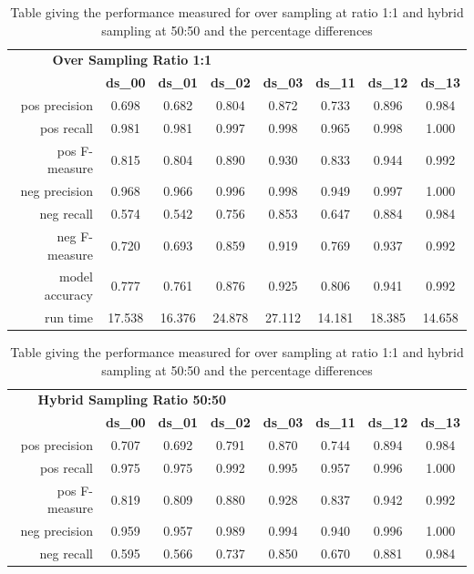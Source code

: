 \begin{table}[h]
\centering
\caption[Performance comparison of over sampling and hybrid sampling]{Table giving the performance measured for over sampling at ratio 1:1 and hybrid sampling at 50:50 and the percentage differences}
\label{tab:chapter5:performance_comparison}
\begin{tabular}{rccccccc}
	\toprule
	\multicolumn{4}{c}{\textbf{Over Sampling Ratio 1:1}} \\
	\cmidrule(r){1-4}
     & \textbf{ds\_00}  & \textbf{ds\_01} & \textbf{ds\_02} & \textbf{ds\_03} & \textbf{ds\_11} & \textbf{ds\_12} & \textbf{ds\_13}   \\
    \midrule
	pos precision & 0.698 & 0.682 & 0.804 & 0.872 & 0.733 & 0.896 & 0.984\\
	pos recall & 0.981 & 0.981 & 0.997 & 0.998 & 0.965 & 0.998 & 1.000\\
	pos F-measure & 0.815 & 0.804 & 0.890 & 0.930 & 0.833 & 0.944 & 0.992\\
	neg precision & 0.968 & 0.966 & 0.996 & 0.998 & 0.949 & 0.997 & 1.000\\
	neg recall & 0.574 & 0.542 & 0.756 & 0.853 & 0.647 & 0.884 & 0.984\\
	neg F-measure & 0.720 & 0.693 & 0.859 & 0.919 & 0.769 & 0.937 & 0.992\\
	model accuracy & 0.777 & 0.761 & 0.876 & 0.925 & 0.806 & 0.941 & 0.992\\
	run time & 17.538 & 16.376 & 24.878 & 27.112 & 14.181 & 18.385 & 14.658\\
    \bottomrule
\end{tabular}
\begin{tabular}{rccccccc}
	\multicolumn{4}{c}{\textbf{Hybrid Sampling Ratio 50:50}} \\
	\cmidrule(r){1-4}
     & \textbf{ds\_00}  & \textbf{ds\_01} & \textbf{ds\_02} & \textbf{ds\_03} & \textbf{ds\_11} & \textbf{ds\_12} & \textbf{ds\_13}   \\
	\midrule
	pos precision & 0.707 & 0.692 & 0.791 & 0.870 & 0.744 & 0.894 & 0.984 \\
	pos recall & 0.975 & 0.975 & 0.992 & 0.995 & 0.957 & 0.996 & 1.000 \\
	pos F-measure & 0.819 & 0.809 & 0.880 & 0.928 & 0.837 & 0.942 & 0.992 \\
	neg precision & 0.959 & 0.957 & 0.989 & 0.994 & 0.940 & 0.996 & 1.000 \\
	neg recall & 0.595 & 0.566 & 0.737 & 0.850 & 0.670 & 0.881 & 0.984 \\

\end{tabular}
\end{table}
